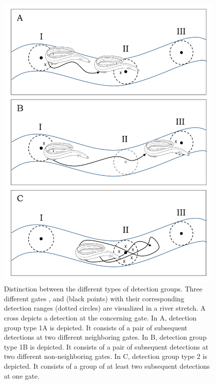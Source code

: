 \documentclass[preprint,12pt,authoryear]{elsarticle}
\newcommand{\RNum}[1]{\uppercase\expandafter{\romannumeral #1\relax}}
\begin{document}
\begin{spacing}{1.9}
\begin{figure}[h!]
  \centering\includegraphics[scale=0.25]{figure_detection_intervals.pdf}
  \caption{Distinction between the different types of detection groups. Three different gates \RNum{1}, \RNum{2} and \RNum{3} (black points) with their corresponding detection ranges (dotted circles) are visualized in a river stretch. A cross depicts a detection at the concerning gate. In A, detection group type 1A is depicted. It consists of a pair of subsequent detections at two different neighboring gates. In B, detection group type 1B is depicted. It consists of a pair of subsequent detections at two different non-neighboring gates. In C, detection group type 2 is depicted. It consists of a group of at least two subsequent detections at one gate.}
  \label{fig:detectionInterval}
\end{figure}


\end{spacing}
\end{document}
